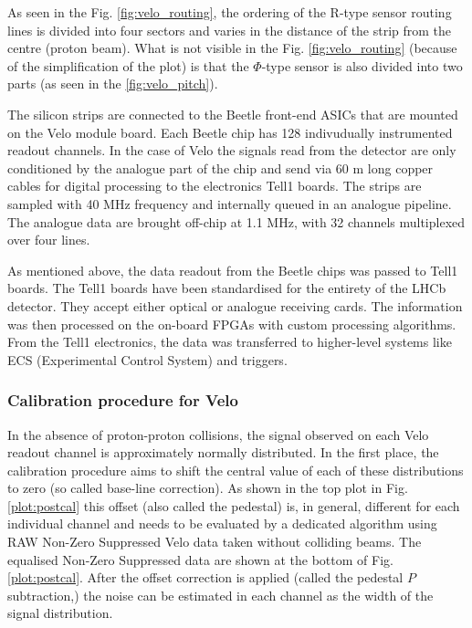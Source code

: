 As seen in the Fig. \ref{fig:velo_routing}, the ordering of the R-type sensor routing lines is divided into four sectors and varies in the distance of the strip from the centre (proton beam). What is not visible in the Fig. \ref{fig:velo_routing} (because of the simplification of the plot) is that the $\Phi$-type sensor is also divided into two parts (as seen in the \ref{fig:velo_pitch}).

The silicon strips are connected to the Beetle front-end ASICs that are mounted on the Velo module board.
Each Beetle chip has 128 indivudually instrumented readout channels. In the case of Velo the signals read from the detector are only conditioned by the analogue part of the chip and send via 60 m long copper cables for digital processing to the electronics Tell1 boards. 
The strips are sampled with 40 MHz frequency and internally queued \cite{Löchner:1000429} in an analogue pipeline.
The analogue data are brought off-chip at 1.1 MHz, with 32 channels multiplexed over four lines.

As mentioned above, the data readout from the Beetle chips was passed to Tell1 boards.
The Tell1 boards have been standardised for the entirety of the LHCb detector.
They accept either optical or analogue receiving cards.
The information was then processed on the on-board FPGAs with custom processing algorithms.
From the Tell1 electronics, the data was transferred to higher-level systems like ECS (Experimental Control System) and triggers.

\subsubsection{Calibration procedure for Velo}
\label{chap2:calibration}
In the absence of proton-proton collisions, the signal observed on each Velo readout channel is approximately normally distributed.
In the first place, the calibration procedure aims to shift the central value of each of these distributions to zero (so called base-line correction).
As shown in the top plot in Fig. \ref{plot:postcal} this offset (also called the pedestal) is, in general, different for each individual channel and needs to be evaluated by a dedicated algorithm using RAW Non-Zero Suppressed Velo data taken without colliding beams.
The equalised Non-Zero Suppressed data are shown at the bottom of Fig. \ref{plot:postcal}.
After the offset correction is applied (called the pedestal $P$ subtraction,\cite{Aaij:1707015}) the noise can be estimated in each channel as the width of the signal distribution.

